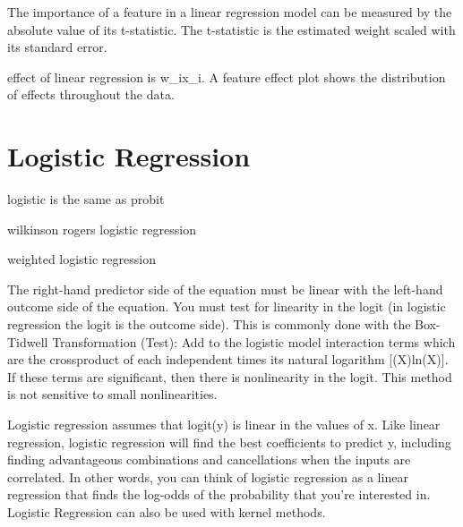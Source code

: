 \documentclass[]{book}
\newenvironment{Shaded}{\begin{snugshade}}{\end{snugshade}}
\newcommand{\KeywordTok}[1]{\textcolor[rgb]{0.13,0.29,0.53}{\textbf{#1}}}
\newcommand{\DataTypeTok}[1]{\textcolor[rgb]{0.13,0.29,0.53}{#1}}
\newcommand{\StringTok}[1]{\textcolor[rgb]{0.31,0.60,0.02}{#1}}
\newcommand{\OperatorTok}[1]{\textcolor[rgb]{0.81,0.36,0.00}{\textbf{#1}}}
\newcommand{\NormalTok}[1]{#1}
\begin{document}
\begin{Shaded}
\end{Shaded}

The importance of a feature in a linear regression model can be measured
by the absolute value of its t-statistic. The t-statistic is the
estimated weight scaled with its standard error.

effect of linear regression is w\_ix\_i. A feature effect plot shows the
distribution of effects throughout the data.

\section{Logistic Regression}\label{logistic-regression}

logistic is the same as probit

wilkinson rogers logistic regression

weighted logistic regression

The right-hand predictor side of the equation must be linear with the
left-hand outcome side of the equation. You must test for linearity in
the logit (in logistic regression the logit is the outcome side). This
is commonly done with the Box-Tidwell Transformation (Test): Add to the
logistic model interaction terms which are the crossproduct of each
independent times its natural logarithm {[}(X)ln(X){]}. If these terms
are significant, then there is nonlinearity in the logit. This method is
not sensitive to small nonlinearities.

Logistic regression assumes that logit(y) is linear in the values of x.
Like linear regression, logistic regression will find the best
coefficients to predict y, including finding advantageous combinations
and cancellations when the inputs are correlated. In other words, you
can think of logistic regression as a linear regression that finds the
log-odds of the probability that you're interested in. Logistic
Regression can also be used with kernel methods.
\end{document}
